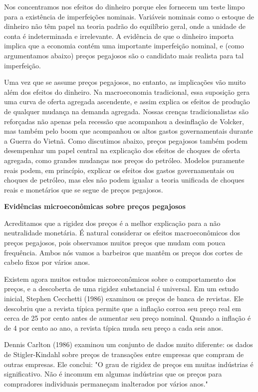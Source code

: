 \documentclass[12pt]{article}
\begin{document}
Nos concentramos nos efeitos do dinheiro porque eles fornecem um teste limpo para a existência de imperfeições nominais. Variáveis nominais como o estoque de dinheiro não têm papel na teoria padrão do equilíbrio geral, onde a unidade de conta é indeterminada e irrelevante. A evidência de que o dinheiro importa implica que a economia contém uma importante imperfeição nominal, e (como argumentamos abaixo) preços pegajosos são o candidato mais realista para tal imperfeição.

Uma vez que se assume preços pegajosos, no entanto, as implicações vão muito além dos efeitos do dinheiro. Na macroeconomia tradicional, essa suposição gera uma curva de oferta agregada ascendente, e assim explica os efeitos de produção de qualquer mudança na demanda agregada. Nossas crenças tradicionalistas são reforçadas não apenas pela recessão que acompanhou a desinflação de Volcker, mas também pelo boom que acompanhou os altos gastos governamentais durante a Guerra do Vietnã. Como discutimos abaixo, preços pegajosos também podem desempenhar um papel central na explicação dos efeitos de choques de oferta agregada, como grandes mudanças nos preços do petróleo. Modelos puramente reais podem, em princípio, explicar os efeitos dos gastos governamentais ou choques de petróleo, mas eles não podem igualar a teoria unificada de choques reais e monetários que se segue de preços pegajosos.

\textbf{Evidências microeconômicas sobre preços pegajosos}

Acreditamos que a rigidez dos preços é a melhor explicação para a não neutralidade monetária. É natural considerar os efeitos macroeconômicos dos preços pegajosos, pois observamos muitos preços que mudam com pouca frequência. Ambos nós vamos a barbeiros que mantêm os preços dos cortes de cabelo fixos por vários anos.

Existem agora muitos estudos microeconômicos sobre o comportamento dos preços, e a descoberta de uma rigidez substancial é universal. Em um estudo inicial, Stephen Cecchetti (1986) examinou os preços de banca de revistas. Ele descobriu que a revista típica permite que a inflação corroa seu preço real em cerca de 25 por cento antes de aumentar seu preço nominal. Quando a inflação é de 4 por cento ao ano, a revista típica muda seu preço a cada seis anos.

Dennis Carlton (1986) examinou um conjunto de dados muito diferente: os dados de Stigler-Kindahl sobre preços de transações entre empresas que compram de outras empresas. Ele conclui: "O grau de rigidez de preços em muitas indústrias é significativo. Não é incomum em algumas indústrias que os preços para compradores individuais permaneçam inalterados por vários anos."
\end{document}
